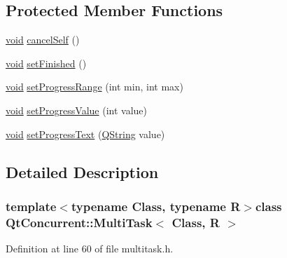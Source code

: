 \subsection*{\-Protected \-Member \-Functions}
\begin{DoxyCompactItemize}
\item 
\hyperlink{group___u_a_v_objects_plugin_ga444cf2ff3f0ecbe028adce838d373f5c}{void} \hyperlink{class_qt_concurrent_1_1_multi_task_a8a071abc42f1ade38f67272c2f984ed7}{cancel\-Self} ()
\item 
\hyperlink{group___u_a_v_objects_plugin_ga444cf2ff3f0ecbe028adce838d373f5c}{void} \hyperlink{class_qt_concurrent_1_1_multi_task_aa74507ce4e750dec0971bcb848cb1d91}{set\-Finished} ()
\item 
\hyperlink{group___u_a_v_objects_plugin_ga444cf2ff3f0ecbe028adce838d373f5c}{void} \hyperlink{class_qt_concurrent_1_1_multi_task_a91baa326d46ee44492bc21787e076274}{set\-Progress\-Range} (int min, int max)
\item 
\hyperlink{group___u_a_v_objects_plugin_ga444cf2ff3f0ecbe028adce838d373f5c}{void} \hyperlink{class_qt_concurrent_1_1_multi_task_a753f3c90016c76312a9ee8295b9c7f31}{set\-Progress\-Value} (int value)
\item 
\hyperlink{group___u_a_v_objects_plugin_ga444cf2ff3f0ecbe028adce838d373f5c}{void} \hyperlink{class_qt_concurrent_1_1_multi_task_a0e1422726966b7d971b46836cff03dc1}{set\-Progress\-Text} (\hyperlink{group___u_a_v_objects_plugin_gab9d252f49c333c94a72f97ce3105a32d}{\-Q\-String} value)
\end{DoxyCompactItemize}


\subsection{\-Detailed \-Description}
\subsubsection*{template$<$typename \-Class, typename \-R$>$class Qt\-Concurrent\-::\-Multi\-Task$<$ Class, R $>$}



\-Definition at line 60 of file multitask.\-h.



